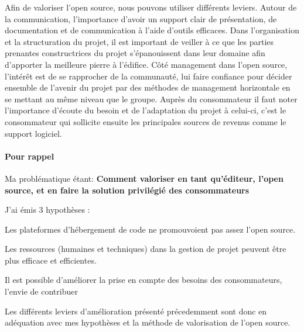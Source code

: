 		Afin de valoriser l'open source, nous pouvons utiliser différents leviers. 
		Autour de la communication, l'importance d'avoir un support clair de présentation, de documentation et de communication à l'aide d'outils efficaces.
		Dans l'organisation et la structuration du projet, il est important de veiller à ce que les parties prenantes constructrices du projet s'épanouissent dans leur domaine afin d'apporter la meilleure pierre à l'édifice. Côté management dans l'open source, l'intérêt est de se rapprocher de la communauté, lui faire confiance pour décider ensemble de l'avenir du projet par des méthodes de management horizontale en se mettant au même niveau que le groupe. Auprès du consommateur il faut noter l'importance d'écoute du besoin et de l'adaptation du projet à celui-ci, c'est le consommateur qui sollicite ensuite les principales sources de revenus comme le support logiciel.

	\paragraph{Pour rappel\\}

		Ma problématique étant: 
		\textbf{Comment valoriser en tant qu'éditeur, l'open source, et en faire la solution privilégié des consommateurs}

		J'ai émis 3 hypothèses : 

		\begin{description}[font=\color{burntorange}]
		\item[Sensibiliser à l'open source: ] Les plateformes d'hébergement de code ne promouvoient pas assez l'open source.
		\item[Optimisation des ressources: ] Les ressources (humaines et techniques) dans la gestion de projet peuvent être plus efficace et efficientes.
		\item[Besoin et envie de contribution: ] Il est possible d'améliorer la prise en compte des besoins des consommateurs, l'envie de contribuer
		\end{description}

		Les différents leviers d'amélioration présenté précedemment sont donc en adéquation avec mes hypothèses et la méthode de valorisation de l'open source.
